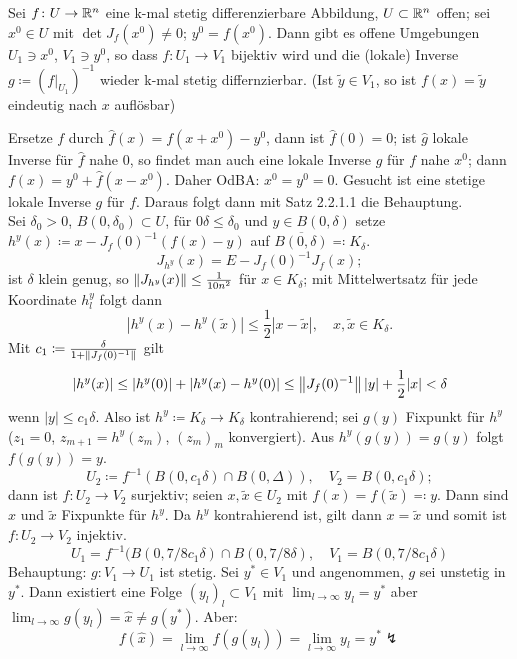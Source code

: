 \begin{satz}
	Sei $ f\colon U\rightarrow\mathbb{R}^n $ eine k-mal stetig differenzierbare Abbildung, $ U\subset\mathbb{R}^n $ offen; sei $ x^0\in U $ mit $ \det J_f(x^0)\neq 0 $; $ y^0=f(x^0) $. Dann gibt es offene Umgebungen $ U_1\ni x^0 $, $ V_1\ni y^0 $, so dass $ f\colon U_1\rightarrow V_1 $ bijektiv wird und die (lokale) Inverse $ g\coloneqq (f|_{U_1})^{-1} $ wieder k-mal stetig differnzierbar. (Ist $ \tilde y\in V_1 $, so ist $ f(x)=\tilde y $ eindeutig nach $ x $ aufl\"osbar) 
\end{satz}
\begin{beweis}
	Ersetze $ f $ durch $ \hat f(x)=f(x+x^0)-y^0 $, dann ist $ \hat f(0)=0 $; ist $ \hat g $ lokale Inverse f\"ur $ \hat f $ nahe $ 0 $, so findet man auch eine lokale Inverse $ g $ f\"ur $ f $ nahe $ x^0 $; dann $ f(x)=y^0+\hat f(x-x^0) $. Daher OdBA: $ x^0=y^0=0 $. Gesucht ist eine stetige lokale Inverse $ g $ f\"ur $ f $. Daraus folgt dann mit Satz 2.2.1.1 die Behauptung.\\
	Sei $ \delta_0>0 $, $ B(0,\delta_0)\subset U $, f\"ur $ 0\delta\leq\delta_0 $ und $ y\in B(0,\delta) $ setze $ h^y(x)\coloneqq x-J_f(0)^{-1}(f(x)-y) $ auf $ \overline{B(0,\delta)}\eqqcolon K_\delta $.
	\[ J_{h^y}(x)=E-J_f(0)^{-1}J_f(x); \]
	ist $ \delta $ klein genug, so $ \left\|J_{h^y}(x)\right\|\leq\frac{1}{10n^2} $ f\"ur $ x\in K_\delta $; mit Mittelwertsatz f\"ur jede Koordinate $ h_l^y $ folgt dann 
	\[ |h^y(x)-h^y(\tilde x)|\leq\frac{1}{2}|x-\tilde x|,\quad x,\tilde x\in K_\delta. \]
	Mit $ c_1\coloneqq\frac{\delta}{1+\left\|J_f(0)^{-1}\right\|} $ gilt
	\[ |h^y(x)|\leq|h^y(0)|+|h^y(x)-h^y(0)|\leq\left\|J_f(0)^{-1}\right\||y|+\frac{1}{2}|x|<\delta \]
	wenn $ |y|\leq c_1\delta $. Also ist $ h^y\coloneqq K_\delta\rightarrow K_\delta $ kontrahierend; sei $ g(y) $ Fixpunkt f\"ur $ h^y $ ($ z_1=0 $, $ z_{m+1}=h^y(z_m) $, $ (z_m)_m $ konvergiert). Aus $ h^y(g(y))=g(y) $ folgt $ f(g(y))=y $.
	\[ U_2\coloneqq f^{-1}(B(0,c_1\delta)\cap B(0,\Delta)),\quad V_2=B(0,c_1\delta); \]
	dann ist $ f\colon U_2\rightarrow V_2 $ surjektiv; seien $ x,\tilde x\in U_2 $ mit $ f(x)=f(\tilde x)\eqqcolon y $. Dann sind $ x $ und $ \tilde x $ Fixpunkte f\"ur $ h^y $. Da $ h^y $ kontrahierend ist, gilt dann $ x=\tilde x $ und somit ist $ f\colon U_2\rightarrow V_2 $ injektiv.
	\[ U_1=f^{-1}(B(0,7/8 c_1\delta)\cap B(0,7/8 \delta),\quad V_1=B(0,7/8 c_1\delta) \]
	Behauptung: $ g\colon V_1\rightarrow U_1 $ ist stetig. Sei $ y^\ast\in V_1 $ und angenommen, $ g $ sei unstetig in $ y^\ast $. Dann existiert eine Folge $ (y_l)_l\subset V_1 $ mit $ \lim_{l\to\infty} y_l=y^\ast $ aber $ \lim_{l\to\infty} g(y_l)=\hat x\neq g(y^\ast) $. Aber:
	\[ f(\hat x)=\lim_{l\to\infty}f(g(y_l))=\lim_{l\to\infty}y_l=y^\ast\lightning \]    
\end{beweis}

